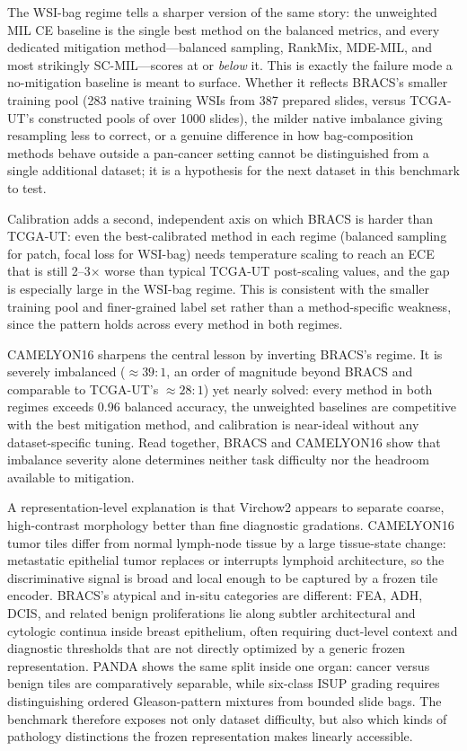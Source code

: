 \documentclass[11pt]{article}
\begin{document}
The WSI-bag regime tells a sharper version of the same story: the unweighted MIL CE baseline is the single best method on the balanced metrics, and every dedicated mitigation method---balanced sampling, RankMix, MDE-MIL, and most strikingly SC-MIL---scores at or \emph{below} it. This is exactly the failure mode a no-mitigation baseline is meant to surface. Whether it reflects BRACS's smaller training pool (283 native training WSIs from 387 prepared slides, versus TCGA-UT's constructed pools of over 1000 slides), the milder native imbalance giving resampling less to correct, or a genuine difference in how bag-composition methods behave outside a pan-cancer setting cannot be distinguished from a single additional dataset; it is a hypothesis for the next dataset in this benchmark to test.

Calibration adds a second, independent axis on which BRACS is harder than TCGA-UT: even the best-calibrated method in each regime (balanced sampling for patch, focal loss for WSI-bag) needs temperature scaling to reach an ECE that is still \num{2}--\num{3}$\times$ worse than typical TCGA-UT post-scaling values, and the gap is especially large in the WSI-bag regime. This is consistent with the smaller training pool and finer-grained label set rather than a method-specific weakness, since the pattern holds across every method in both regimes.

CAMELYON16 sharpens the central lesson by inverting BRACS's regime. It is severely imbalanced (${\approx}39{:}1$, an order of magnitude beyond BRACS and comparable to TCGA-UT's ${\approx}28{:}1$) yet nearly solved: every method in both regimes exceeds \num{0.96} balanced accuracy, the unweighted baselines are competitive with the best mitigation method, and calibration is near-ideal without any dataset-specific tuning. Read together, BRACS and CAMELYON16 show that imbalance severity alone determines neither task difficulty nor the headroom available to mitigation.

A representation-level explanation is that Virchow2 appears to separate coarse, high-contrast morphology better than fine diagnostic gradations. CAMELYON16 tumor tiles differ from normal lymph-node tissue by a large tissue-state change: metastatic epithelial tumor replaces or interrupts lymphoid architecture, so the discriminative signal is broad and local enough to be captured by a frozen tile encoder. BRACS's atypical and in-situ categories are different: FEA, ADH, DCIS, and related benign proliferations lie along subtler architectural and cytologic continua inside breast epithelium, often requiring duct-level context and diagnostic thresholds that are not directly optimized by a generic frozen representation. PANDA shows the same split inside one organ: cancer versus benign tiles are comparatively separable, while six-class ISUP grading requires distinguishing ordered Gleason-pattern mixtures from bounded slide bags. The benchmark therefore exposes not only dataset difficulty, but also which kinds of pathology distinctions the frozen representation makes linearly accessible.
\end{document}
